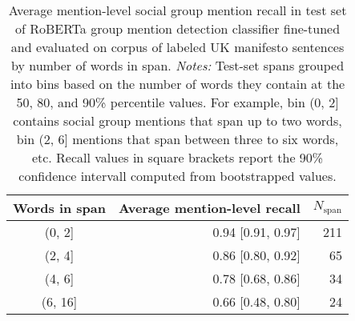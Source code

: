 \begin{table}[!h]

\caption{\label{tab:uk-manifestos_roberta_testset_sg_recall_by_span_length}Average mention-level social group mention recall in test set of RoBERTa group mention detection classifier fine-tuned and evaluated on corpus of labeled UK manifesto sentences by number of words in span. \emph{Notes:} Test-set spans grouped into bins based on the number of words they contain at the 50, 80, and 90\% percentile values. For example, bin (0, 2] contains social group mentions that span up to two words, bin (2, 6] mentions that span between three to six words, etc. Recall values in square brackets report the 90\% confidence intervall computed from bootstrapped values.}
\centering
\fontsize{10}{12}\selectfont
\begin{tabular}[t]{crr}
\toprule
Words in span & Average mention-level recall & $N_{\text{span}}$\\
\midrule
(0, 2] & 0.94 [0.91, 0.97] & 211\\
(2, 4] & 0.86 [0.80, 0.92] & 65\\
(4, 6] & 0.78 [0.68, 0.86] & 34\\
(6, 16] & 0.66 [0.48, 0.80] & 24\\
\bottomrule
\end{tabular}
\end{table}
